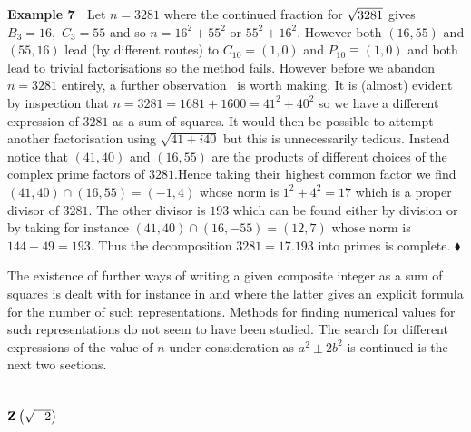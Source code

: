 \documentclass[12pt]{article}
\begin{document}
\textbf{Example 7 \ }Let $n=3281$ where the continued fraction for $\sqrt{%
3281}$ gives $B_{3}=16,$ $C_{3}=55$ and so $n=16^{2}+55^{2}$ or $%
55^{2}+16^{2}.$ However both $\left( 16,55\right) $ and $\left( 55,16\right) 
$ lead (by different routes) to $C_{10}=\left( 1,0\right) $ and $%
P_{10}\equiv \left( 1,0\right) $ and both lead to trivial factorisations so
the method fails. However before we abandon $n=3281$ entirely, a further
observation \ is worth making. It is (almost) evident by inspection that $%
n=3281=1681+1600=41^{2}+40^{2}$ so we have a different expression of $3281$
as a sum of squares. It would then be possible to attempt another
factorisation using $\sqrt{41+i40}$ but this is unnecessarily tedious.
Instead notice that $\left( 41,40\right) $ and $(16,55)$ are the products of
different choices of the complex prime factors of $3281.$Hence taking their
highest common factor we find $\left( 41,40\right) \cap \left( 16,55\right)
=\left( -1,4\right) $ whose norm is $1^{2}+4^{2}=17$ which is a proper
divisor of $3281$. The other divisor is $193$ which can be found either by
division or by taking for instance $\left( 41,40\right) \cap \left(
16,-55\right) =\left( 12,7\right) $ whose norm is $144+49=193.$ Thus the
decomposition $3281=17.193$ into primes is complete. $\blacklozenge $

The existence of further ways of writing a given composite integer as a sum
of squares is dealt with for instance in \cite[Ch. 19, p.164]%
{Mordell:1969:DT} and \cite[p, 101]{Landau:1927:VZ} where the latter gives
an explicit formula for the number of such representations. Methods for
finding numerical values for such representations do not seem to have been
studied. The search for different expressions of the value of $n$ under
consideration as $a^{2}\pm 2b^{2}$ is continued is the next two sections.

\section{$\mathbf{Z}\left( \protect\sqrt{-2}\right) $\label{zmt}}
\end{document}
